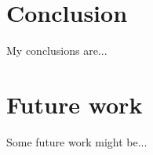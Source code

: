 \label{sec:conclusion}

\section{Conclusion}
My conclusions are...

\section{Future work}
Some future work might be...

